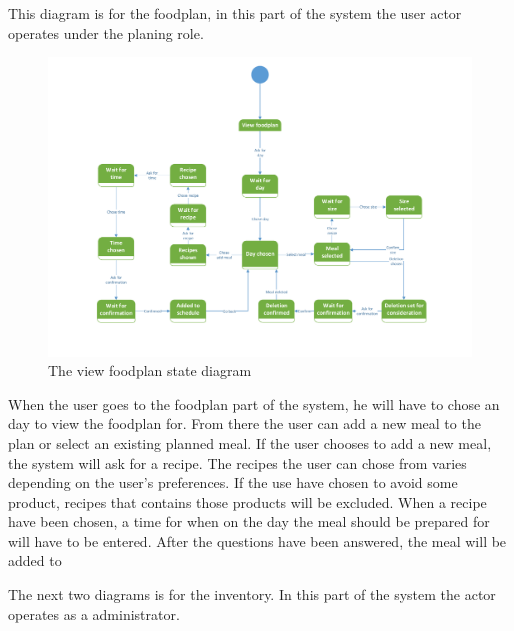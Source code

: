 This diagram is for the foodplan, in this part of the system the user actor operates under the planing role.

\begin{figure}[H]
	\centering
	\includegraphics[width=1.0\textwidth]{ApplicationDomain/spViewFoodPlan.pdf} 
	\caption{The view foodplan state diagram}
	\label{Foodplan_Figure}
\end{figure}
When the user goes to the foodplan part of the system, he will have to chose an day to view the foodplan for. From there the user can add a new meal to the plan or select an existing planned meal. If the user chooses to add a new meal, the system will ask for a recipe. The recipes the user can chose from varies depending on the user's preferences. If the use have chosen to avoid some product, recipes that contains those products will be excluded. When a recipe have been chosen, a time for when on the day the meal should be prepared for will have to be entered. After the questions have been answered, the meal will be added to 


The next two diagrams is for the inventory. In this part of the system the actor operates as a administrator.

